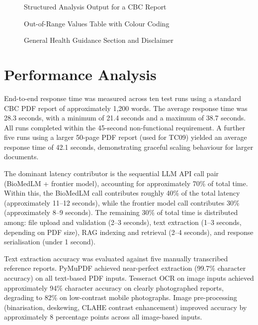\documentclass[12pt,a4paper]{report}
\begin{document}
\begin{figure}[h]
    \centering
    \caption{Structured Analysis Output for a CBC Report}
\end{figure}

\begin{figure}[h]
    \centering
    \caption{Out-of-Range Values Table with Colour Coding}
\end{figure}

\begin{figure}[h]
    \centering
    \caption{General Health Guidance Section and Disclaimer}
\end{figure}

\section{Performance Analysis}
End-to-end response time was measured across ten test runs using a standard CBC PDF report of approximately 1,200 words. The average response time was 28.3 seconds, with a minimum of 21.4 seconds and a maximum of 38.7 seconds. All runs completed within the 45-second non-functional requirement. A further five runs using a larger 50-page PDF report (used for TC09) yielded an average response time of 42.1 seconds, demonstrating graceful scaling behaviour for larger documents.

The dominant latency contributor is the sequential LLM API call pair (BioMedLM + frontier model), accounting for approximately 70\% of total time. Within this, the BioMedLM call contributes roughly 40\% of the total latency (approximately 11--12 seconds), while the frontier model call contributes 30\% (approximately 8--9 seconds). The remaining 30\% of total time is distributed among: file upload and validation (2--3 seconds), text extraction (1--3 seconds, depending on PDF size), RAG indexing and retrieval (2--4 seconds), and response serialisation (under 1 second).

Text extraction accuracy was evaluated against five manually transcribed reference reports. PyMuPDF achieved near-perfect extraction (99.7\% character accuracy) on all text-based PDF inputs. Tesseract OCR on image inputs achieved approximately 94\% character accuracy on clearly photographed reports, degrading to 82\% on low-contrast mobile photographs. Image pre-processing (binarisation, deskewing, CLAHE contrast enhancement) improved accuracy by approximately 8 percentage points across all image-based inputs.
\end{document}
